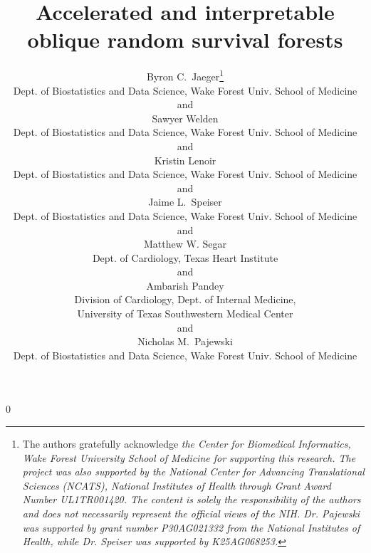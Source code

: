 \documentclass[12pt]{article}\usepackage[]{graphicx}\usepackage[]{xcolor}
\newcommand{\blind}{0}
\begin{document}
%

\def\spacingset#1{\renewcommand{\baselinestretch}%
{#1}\small\normalsize} \spacingset{1}



\blind
{
  \title{\bf Accelerated and interpretable oblique random survival forests}
  \author{Byron C.~Jaeger\thanks{
    The authors gratefully acknowledge \textit{the Center for Biomedical Informatics, Wake Forest University School of Medicine for supporting this research. The project was also supported by the National Center for Advancing Translational Sciences (NCATS), National Institutes of Health through Grant Award Number UL1TR001420. The content is solely the responsibility of the authors and does not necessarily represent the official views of the NIH. Dr. Pajewski was supported by grant number P30AG021332 from the National Institutes of Health, while Dr. Speiser was supported by K25AG068253.}}\hspace{.2cm}\\
   Dept. of Biostatistics and Data Science,
	 Wake Forest Univ. School of Medicine\\
  and \\
   Sawyer Welden \\
   Dept. of Biostatistics and Data Science,
   Wake Forest Univ. School of Medicine \\
  and \\
   Kristin Lenoir \\
   Dept. of Biostatistics and Data Science,
   Wake Forest Univ. School of Medicine\\
  and \\
   Jaime L.~Speiser \\
	 Dept. of Biostatistics and Data Science,
	 Wake Forest Univ. School of Medicine\\
	and \\
	 Matthew W. Segar \\
   Dept. of Cardiology,
   Texas Heart Institute \\
  and \\
   Ambarish Pandey \\
   Division of Cardiology, Dept. of Internal Medicine, \\
   University of Texas Southwestern Medical Center \\
  and \\
   Nicholas M.~Pajewski \\
	 Dept. of Biostatistics and Data Science,
	 Wake Forest Univ. School of Medicine
  }
  \maketitle
} \fi
\end{document}
